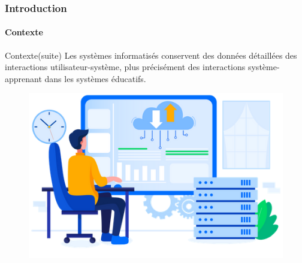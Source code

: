 \documentclass[aspectratio=169,professionalfonts, 12pt]{beamer}
\begin{document}
\begin{frame}
  \frametitle{Introduction}
  \framesubtitle{Contexte}
  \begin{minipage}{0.5\textwidth}
    \begin{block}{Contexte(suite)}
    Les systèmes informatisés conservent des données détaillées des interactions utilisateur-système, plus précisément des interactions système-apprenant dans les systèmes éducatifs.
    \end{block}
  \end{minipage}
  \begin{minipage}{2cm}
  
  \end{minipage}
  \begin{minipage}{0.4\textwidth}
    \begin{figure}[t]
    \begin{center}
      \includegraphics[width=\textwidth]{images/etat_art/database_illustration.png}
    \end{center}
    \end{figure} 
  \end{minipage}
\end{frame}
\end{document}
